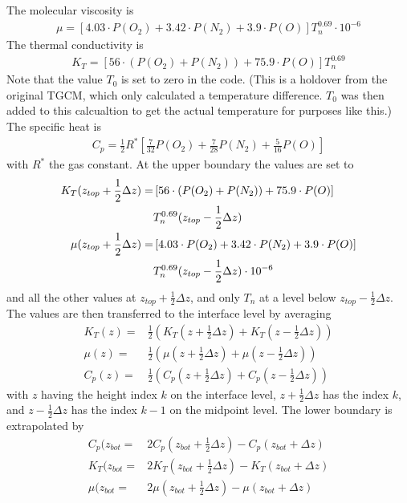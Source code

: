%
The molecular viscosity is
%
\begin{align}
 \mu = \left[ 4.03 \cdot P(O_2) + 3.42 \cdot P(N_2) + 3.9 \cdot
 P(O)\right] T_n^{0.69} \cdot 10^{-6}
\end{align}
%
The thermal conductivity is
%
\begin{align}
  K_T = \left[ 56 \cdot \left( P(O_2) + P(N_2)\right) + 75.9 \cdot
  P(O)\right] T_n^{0.69}
\end{align}
%
Note that the value $T_0$ is set to zero in the code. (This is a holdover from
the original TGCM, which only calculated a temperature difference. $T_0$ was
then added to this calcualtion to get the actual temperature for purposes like
this.) The specific
heat is
%
\begin{align}
  C_p = \frac{1}{2} R^* \left[ \frac{7}{32} P(O_2) + \frac{7}{28} P(N_2)+ \frac{5}{16} P(O)\right]
\end{align}
%
with $R^*$ the gas constant. At the upper boundary the values are
set to
%
\begin{align}
  K_T(z_{top} + \frac{1}{2} \Delta z) =& \left[ 56 \cdot \left( P(O_2) + P(N_2)\right) + 75.9 \cdot
  P(O)\right] \notag \\
    {} & T_n^{0.69}(z_{top} - \frac{1}{2} \Delta z) \\
 \mu(z_{top} + \frac{1}{2} \Delta z) = & \left[ 4.03 \cdot P(O_2) + 3.42 \cdot P(N_2) + 3.9 \cdot
 P(O)\right]\notag \\
   {} & T_n^{0.69}(z_{top} - \frac{1}{2} \Delta z) \cdot 10^{-6}
\end{align}
%
and all the other values at $z_{top} + \frac{1}{2} \Delta z$, and
only $T_n$ at a level below $z_{top} - \frac{1}{2} \Delta z$. The
values are then transferred to the interface level by averaging
%
\begin{align}
  K_T(z) = & \frac{1}{2} (K_T(z+\frac{1}{2}\Delta z) +K_T(z-\frac{1}{2}\Delta
  z))\\
  \mu(z) = & \frac{1}{2} (\mu(z+\frac{1}{2}\Delta z) +\mu(z-\frac{1}{2}\Delta
  z))\\
  C_p(z) = & \frac{1}{2} (C_p(z+\frac{1}{2}\Delta z) +C_p(z-\frac{1}{2}\Delta
  z))
\end{align}
%
with $z$ having the height index $k$ on the interface level,
$z+\frac{1}{2}\Delta z$ has the index $k$, and $z-\frac{1}{2}\Delta
z$ has the index $k-1$ on the midpoint level. The lower boundary is
extrapolated by
%
\begin{align}
   C_p(z_{bot} = & 2 C_p(z_{bot} + \frac{1}{2} \Delta z) - C_p(z_{bot} +\Delta
   z) \\
   K_T(z_{bot} = & 2 K_T (z_{bot} + \frac{1}{2} \Delta z) - K_T(z_{bot} +\Delta
   z) \\
   \mu(z_{bot} = & 2 \mu(z_{bot} + \frac{1}{2} \Delta z) - \mu(z_{bot} +\Delta
   z) \\
\end{align}
%
%
